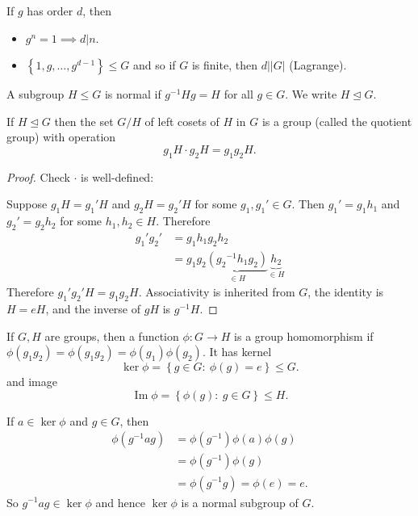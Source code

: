 \documentclass[a4paper]{scrartcl}
\begin{document}
\begin{remark}
     If $g$ has order $d$, then 
     \begin{itemize}
         \item $g^{n}=1 \implies d|n$. 
         \item $\left\{1,g, \ldots , g^{d-1}\right\}\leq G$ and so if $G$ is finite, then $d | |G|$ (Lagrange).
     \end{itemize}
\end{remark}
\begin{definition}
     A subgroup $H \leq G$ is normal if ${g}^{-1}Hg=H$ for all $g \in G$. We write $H \unlhd G$.
\end{definition}
\begin{proposition}
     If $H \unlhd G$ then the set $G/H$ of left cosets of $H$ in $G$ is a group (called the quotient group) with operation \[
     g_1 H \cdot g_2 H= g_1 g_2 H
     .\] 
\end{proposition}
\begin{proof}
     Check $\cdot $ is well-defined:

     Suppose $g_1 H=g_1 ' H$ and $g_2 H= g_2 ' H$ for some $g_1 , g_1 ' \in G$. Then $g_1 ' =g_1 h_1 $ and $g_2 '=g_2 h_2 $ for some $h_1 , h_2 \in H$. Therefore 
     \begin{align*}
         g_1 ' g_2 ' &=g_1 h_1 g_2 h_2 \\
         &=g_1 g_2 \underbrace{({g_2 }^{-1}h_1 g_2 )}_{\in H} \underbrace{ h_2}_{\in H} 
     \end{align*}  
     Therefore $g_1 ' g_2 ' H=g_1 g_2 H$.
     Associativity is inherited from $G$, the identity is $H=eH$, and the inverse of $gH$ is ${g}^{-1}H$.
\end{proof}

\begin{definition}[Homomorphism]
     If $G,H$ are groups, then a function $\phi: G \rightarrow H$ is a group homomorphism if $\phi (g_1 g_2)=\phi (g_1 g_2 )=\phi (g_1 )\phi (g_2 )$. It has kernel \[
     \operatorname{ker} \phi= \left\{g \in G: \ \phi (g)=e\right\} \leq G
     .\]  and image \[
     \operatorname{Im} \phi = \left\{\phi (g): \ g \in G \right\} \leq H
     .\] 
\end{definition}
\begin{remark}
     If $a \in \operatorname{ker}\phi$ and $g \in G$, then 
     \begin{align*}
         \phi ({g}^{-1}ag)&=\phi ({g}^{-1}) \phi (a) \phi (g)\\
         &=\phi ({g}^{-1}) \phi (g)\\
         &= \phi ({g}^{-1}g)=\phi (e)=e.
     \end{align*}
     So ${g}^{-1}ag \in \operatorname{ker}\phi$ and hence $\operatorname{ker}\phi$ is a normal subgroup of $G$.
\end{remark}
\end{document}
